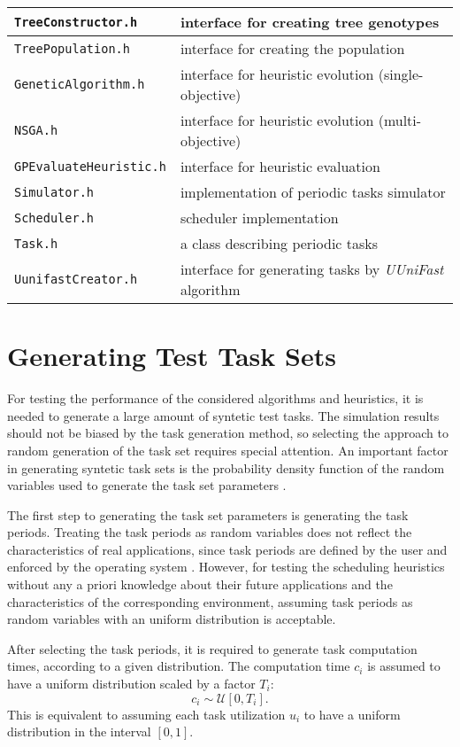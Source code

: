 \begin{table}[H]
\begin{tabular}{|
>{\columncolor[HTML]{FFFFFF}}l |
>{\columncolor[HTML]{FFFFFF}}l |}
\texttt{TreeConstructor.h} & interface for creating tree genotypes \\ \hline
\texttt{TreePopulation.h} & interface for creating the population \\ \hline
\texttt{GeneticAlgorithm.h} & interface for heuristic evolution (single-objective) \\ \hline
\texttt{NSGA.h} & interface for heuristic evolution (multi-objective) \\ \hline
\texttt{GPEvaluateHeuristic.h} & interface for heuristic evaluation \\ \hline
\texttt{Simulator.h} & implementation of periodic tasks simulator \\ \hline
\texttt{Scheduler.h} & scheduler implementation \\ \hline
\texttt{Task.h} & a class describing periodic tasks \\ \hline
\texttt{UunifastCreator.h} & interface for generating tasks by \textit{UUniFast} algorithm \\ \hline
\end{tabular}
\end{table}

\section{Generating Test Task Sets}
For testing the performance of the considered algorithms and heuristics, it is needed to generate a large amount of syntetic test tasks.
The simulation results should not be biased by the task generation method, so selecting the approach to random generation of the task set requires special attention.
An important factor in generating syntetic task sets is the probability density function of the random variables used to generate the task set parameters \cite{bini2005measuring}.

The first step to generating the task set parameters is generating the task periods.
Treating the task periods as random variables does not reflect the characteristics of real applications, since task periods are defined by the user and enforced by the operating system \cite{bini2005measuring}.
However, for testing the scheduling heuristics without any a priori knowledge about their future applications and the characteristics of the corresponding environment, assuming task periods as random variables with an uniform distribution is acceptable.

After selecting the task periods, it is required to generate task computation times, according to a given distribution.
The computation time $c_i$ is assumed to have a uniform distribution scaled by a factor $T_i$:
\begin{equation*}
c_i \sim \mathcal{U}[0, T_i].
\end{equation*}
This is equivalent to assuming each task utilization $u_i$ to have a uniform distribution in the interval $[0, 1]$.

